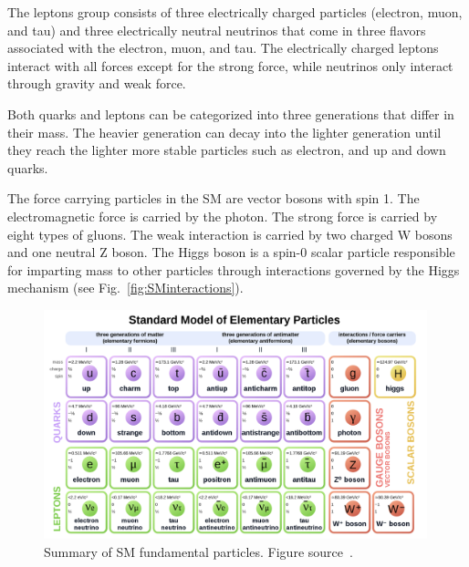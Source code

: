 The leptons group consists of three electrically charged particles (electron, muon, and tau) and three electrically neutral neutrinos that come in three flavors associated with the electron, muon, and tau. The electrically charged leptons interact with all forces except for the strong force, while neutrinos only interact through gravity and weak force.

Both quarks and leptons can be categorized into
three generations that differ in their mass.
The heavier generation can decay into the lighter generation
until they reach the lighter more stable particles such as electron, and up and down quarks.

The force carrying particles in the SM are vector bosons with spin 1. The electromagnetic force is carried by the photon. The strong force is carried by eight types of gluons. The weak interaction is carried by two charged W bosons and one neutral Z boson.
The Higgs boson is a spin-0 scalar particle responsible for imparting mass to other particles through interactions governed by the Higgs mechanism (see Fig.~\ref{fig:SMinteractions}).



\begin{figure}[t!]
\centering
\includegraphics[width=0.99\textwidth]{figures/SM_include_antimatter.png}
\caption[Summary of standard model fundamental particles]{Summary of SM fundamental particles. Figure source~\cite{SMtable}.
\label{fig:SMParticles}}
\end{figure}

